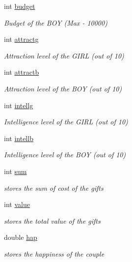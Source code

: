 \begin{DoxyCompactItemize}
int \hyperlink{classcouples_a0f8c151a59679e664969db57426ac1c6}{budget}
\begin{DoxyCompactList}\small\item\em Budget of the B\-O\-Y (Max -\/ 10000) \end{DoxyCompactList}\item 
int \hyperlink{classcouples_a126d94fab4897bba6f93bf2fddaba430}{attractg}
\begin{DoxyCompactList}\small\item\em Attraction level of the G\-I\-R\-L (out of 10) \end{DoxyCompactList}\item 
int \hyperlink{classcouples_aa939bf2c1769e9354a2b0b67c20eaea6}{attractb}
\begin{DoxyCompactList}\small\item\em Attraction level of the B\-O\-Y (out of 10) \end{DoxyCompactList}\item 
int \hyperlink{classcouples_a1c41f421dea55fb7f4eb45f6fb2e71d3}{intellg}
\begin{DoxyCompactList}\small\item\em Intelligence level of the G\-I\-R\-L (out of 10) \end{DoxyCompactList}\item 
int \hyperlink{classcouples_ab429dcb707ba6dd54208431a24780ce3}{intellb}
\begin{DoxyCompactList}\small\item\em Intelligence level of the B\-O\-Y (out of 10) \end{DoxyCompactList}\item 
int \hyperlink{classcouples_acf90278e6967e07c7d03686d4d389b43}{sum}
\begin{DoxyCompactList}\small\item\em stores the sum of cost of the gifts \end{DoxyCompactList}\item 
int \hyperlink{classcouples_a7ead49e8a89affe8f2988196947e280c}{value}
\begin{DoxyCompactList}\small\item\em stores the total value of the gifts \end{DoxyCompactList}\item 
double \hyperlink{classcouples_ae5dc16b92f1846c004c0a21ef7b9e693}{hap}
\begin{DoxyCompactList}\small\item\em stores the happiness of the couple \end{DoxyCompactList}\item 

\end{DoxyCompactItemize}
